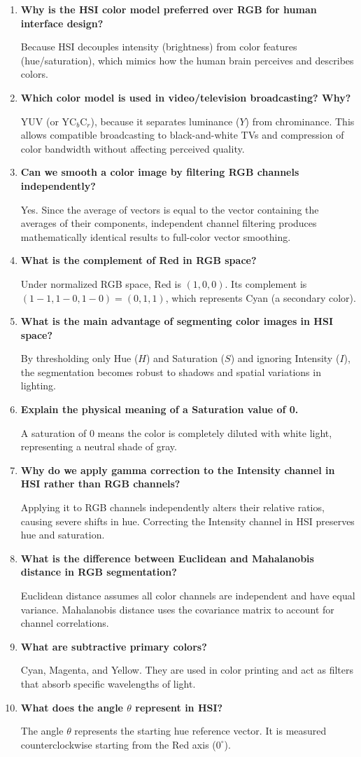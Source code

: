 \documentclass[12pt,a4paper]{article}
\newcommand{\Q}[1]{\textbf{#1}\par\noindent\ignorespaces}
\begin{document}
\begin{tcolorbox}[exambox, title={\textbf{Frequently Asked / Viva Questions}}]
\begin{enumerate}[leftmargin=*, itemsep=3.5pt, label=\arabic*.]
  \item \Q{Why is the HSI color model preferred over RGB for human interface design?} Because HSI decouples intensity (brightness) from color features (hue/saturation), which mimics how the human brain perceives and describes colors.
  \item \Q{Which color model is used in video/television broadcasting? Why?} YUV (or $\text{YC}_b\text{C}_r$), because it separates luminance ($Y$) from chrominance. This allows compatible broadcasting to black-and-white TVs and compression of color bandwidth without affecting perceived quality.
  \item \Q{Can we smooth a color image by filtering RGB channels independently?} Yes. Since the average of vectors is equal to the vector containing the averages of their components, independent channel filtering produces mathematically identical results to full-color vector smoothing.
  \item \Q{What is the complement of Red in RGB space?} Under normalized RGB space, Red is $(1,0,0)$. Its complement is $(1-1, 1-0, 1-0) = (0,1,1)$, which represents Cyan (a secondary color).
  \item \Q{What is the main advantage of segmenting color images in HSI space?} By thresholding only Hue ($H$) and Saturation ($S$) and ignoring Intensity ($I$), the segmentation becomes robust to shadows and spatial variations in lighting.
  \item \Q{Explain the physical meaning of a Saturation value of 0.} A saturation of 0 means the color is completely diluted with white light, representing a neutral shade of gray.
  \item \Q{Why do we apply gamma correction to the Intensity channel in HSI rather than RGB channels?} Applying it to RGB channels independently alters their relative ratios, causing severe shifts in hue. Correcting the Intensity channel in HSI preserves hue and saturation.
  \item \Q{What is the difference between Euclidean and Mahalanobis distance in RGB segmentation?} Euclidean distance assumes all color channels are independent and have equal variance. Mahalanobis distance uses the covariance matrix to account for channel correlations.
  \item \Q{What are subtractive primary colors?} Cyan, Magenta, and Yellow. They are used in color printing and act as filters that absorb specific wavelengths of light.
  \item \Q{What does the angle $\theta$ represent in HSI?} The angle $\theta$ represents the starting hue reference vector. It is measured counterclockwise starting from the Red axis ($0^\circ$).
\end{enumerate}
\end{tcolorbox}
\end{document}
